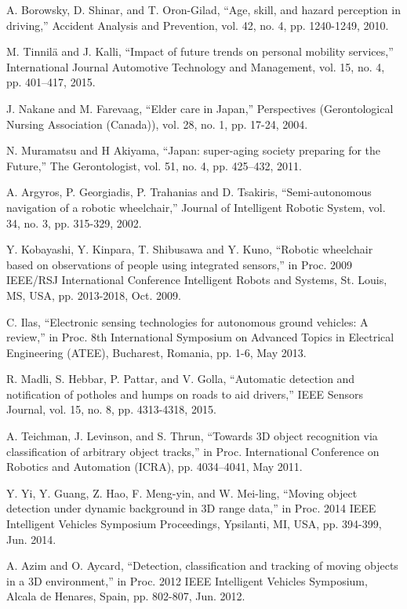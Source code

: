 \documentclass{ieeeaccess}
\begin{document}
\begin{thebibliography}{00}

 A. Borowsky, D. Shinar, and T. Oron-Gilad, ``Age, skill, and hazard perception in driving,'' Accident Analysis and Prevention, vol. 42, no. 4, pp. 1240-1249, 2010.

  M. Tinnilä and J. Kalli, ``Impact of future trends on personal mobility services,'' International Journal Automotive Technology and Management, vol. 15, no. 4, pp. 401–417, 2015.

 J. Nakane and M. Farevaag, ``Elder care in Japan,'' Perspectives (Gerontological Nursing Association (Canada)), vol. 28, no. 1, pp. 17-24, 2004.

 N. Muramatsu and H Akiyama, ``Japan: super-aging society preparing for the Future,'' The Gerontologist, vol. 51, no. 4, pp. 425–432, 2011.

 A. Argyros, P. Georgiadis, P. Trahanias and D. Tsakiris, ``Semi-autonomous navigation of a robotic wheelchair,'' Journal of Intelligent Robotic System, vol. 34, no. 3, pp. 315-329, 2002.

 Y. Kobayashi, Y. Kinpara, T. Shibusawa and Y. Kuno, ``Robotic wheelchair based on observations of people using integrated sensors,'' in Proc. 2009 IEEE/RSJ International Conference Intelligent Robots and Systems, St. Louis, MS, USA, pp. 2013-2018, Oct. 2009.

 C. Ilas, ``Electronic sensing technologies for autonomous ground vehicles: A review,'' in Proc. 8th International Symposium on Advanced Topics in Electrical Engineering (ATEE), Bucharest, Romania, pp. 1-6, May 2013.

 R. Madli, S. Hebbar, P. Pattar, and V. Golla, ``Automatic detection and notification of potholes and humps on roads to aid drivers,'' IEEE Sensors Journal, vol. 15, no. 8, pp. 4313-4318, 2015.

 A. Teichman, J. Levinson, and S. Thrun, ``Towards 3D object recognition via classification of arbitrary object tracks,'' in Proc. International Conference on Robotics and Automation (ICRA), pp. 4034–4041, May 2011.

 Y. Yi, Y. Guang, Z. Hao, F. Meng-yin, and W. Mei-ling, ``Moving object detection under dynamic background in 3D range data,'' in Proc. 2014 IEEE Intelligent Vehicles Symposium Proceedings, Ypsilanti, MI, USA, pp. 394-399, Jun. 2014.

 A. Azim and O. Aycard, ``Detection, classification and tracking of moving objects in a 3D environment,'' in Proc. 2012 IEEE Intelligent Vehicles Symposium, Alcala de Henares, Spain, pp. 802-807, Jun. 2012.


\end{thebibliography}
\end{document}
